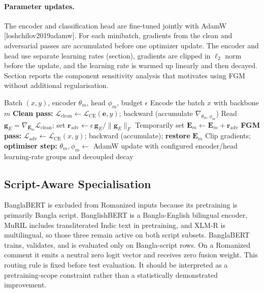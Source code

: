 \documentclass[11pt,a4paper]{article}
\def\citep#1{[#1]}%
\def\Cref#1{Section}%
\def\cref#1{section}%
\def\texttt#1{#1}%
\begin{document}
\paragraph{Parameter updates.} The encoder and classification head are fine-tuned jointly with AdamW \citep{loshchilov2019adamw}. For each minibatch, gradients from the clean and adversarial passes are accumulated before one optimizer update. The encoder and head use separate learning rates (\cref{tab:hparams}), gradients are clipped in $\ell_2$ norm before the update, and the learning rate is warmed up linearly and then decayed. \Cref{sec:ablation-results} reports the component sensitivity analysis that motivates using FGM without additional regularisation.

\begin{algorithm}[!htbp]
\caption{Cross-entropy $+$ FGM fine-tuning of one backbone (single mini-batch).}
\label{alg:fgm}
\begin{algorithmic}[1]
\Require Batch $(x, y)$, encoder $\theta_m$, head $\phi_m$, budget $\epsilon$
\State Encode the batch $x$ with backbone $m$
\State \textbf{Clean pass:} $\mathcal{L}_{\mathrm{clean}} \leftarrow \mathcal{L}_{\mathrm{CE}}(\mathbf{e}, y)$;\; \texttt{backward} (accumulate $\nabla_{\theta_m,\phi_m}$)
\State Read $\mathbf{g}_{E}=\nabla_{\mathbf{E}_m}\mathcal{L}_{\mathrm{clean}}$; set $\mathbf{r}_{\mathrm{adv}}\leftarrow\epsilon\,\mathbf{g}_{E}/\|\mathbf{g}_{E}\|_F$ \Comment{\cref{eq:fgm}}
\State Temporarily set $\mathbf{E}_m\leftarrow\mathbf{E}_m+\mathbf{r}_{\mathrm{adv}}$
\State \textbf{FGM pass:} $\mathcal{L}_{\mathrm{adv}}\leftarrow\mathcal{L}_{\mathrm{CE}}(x,y)$;\; \texttt{backward} (accumulate);\; \textbf{restore} $\mathbf{E}_m$
\State Clip gradients;\; \textbf{optimiser step:} $\theta_m,\phi_m\leftarrow$ AdamW update with configured encoder/head learning-rate groups and decoupled decay
\end{algorithmic}
\end{algorithm}

\subsection{Script-Aware Specialisation}
\label{sec:scriptaware}

BanglaBERT is excluded from Romanized inputs because its pretraining is primarily Bangla script. BanglishBERT is a Bangla-English bilingual encoder, MuRIL includes transliterated Indic text in pretraining, and XLM-R is multilingual, so those three remain active on both script subsets. BanglaBERT trains, validates, and is evaluated only on Bangla-script rows. On a Romanized comment it emits a neutral zero logit vector and receives zero fusion weight. This routing rule is fixed before test evaluation. It should be interpreted as a pretraining-scope constraint rather than a statistically demonstrated improvement.
\end{document}

